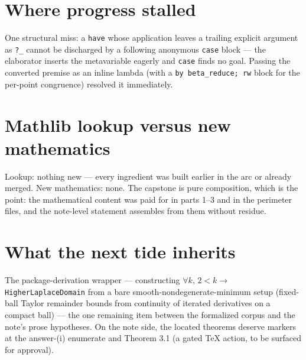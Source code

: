 \documentclass[11pt]{article}
\newcommand{\code}[1]{\texttt{#1}}
\begin{document}
\section{Where progress stalled}

One structural miss: a \code{have} whose application leaves a
trailing explicit argument as \code{?\_} cannot be discharged by a
following anonymous \code{case} block --- the elaborator inserts the
metavariable eagerly and \code{case} finds no goal. Passing the
converted premise as an inline lambda (with a
\code{by beta\_reduce; rw} block for the per-point congruence)
resolved it immediately.

\section{Mathlib lookup versus new mathematics}

Lookup: nothing new --- every ingredient was built earlier in the
arc or already merged. New mathematics: none. The capstone is pure
composition, which is the point: the mathematical content was paid
for in parts 1--3 and in the perimeter files, and the note-level
statement assembles from them without residue.

\section{What the next tide inherits}

The package-derivation wrapper --- constructing
$\forall k,\, 2 < k \to$ \code{HigherLaplaceDomain} from a bare
smooth-nondegenerate-minimum setup (fixed-ball Taylor remainder
bounds from continuity of iterated derivatives on a compact ball) ---
the one remaining item between the formalized corpus and the note's
prose hypotheses. On the note side, the located theorems deserve
markers at the answer-(i) enumerate and Theorem 3.1 (a gated TeX
action, to be surfaced for approval).
\end{document}
